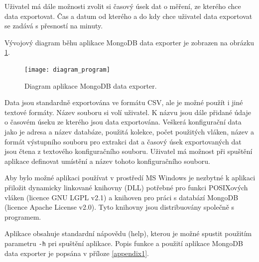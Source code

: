 Uživatel má dále možnosti zvolit si časový úsek dat o měření, ze kterého chce data exportovat. Čas a datum od kterého a do kdy chce uživatel data exportovat se zadává s přesností na minuty. 

Vývojový diagram běhu aplikace MongoDB data exporter je zobrazen na obrázku \ref{diagram_program_pic}.

\begin{figure}[ht]
    \texttt{[image: diagram\_program]}
    \caption{Diagram aplikace MongoDB data exporter.}
    \label{diagram_program_pic}
\end{figure}

Data jsou standardně exportována ve formátu CSV, ale je možné použít i jiné textové formáty. Název souboru si volí uživatel. K názvu jsou dále přidané údaje o časovém úseku ze kterého jsou data exportována.
\newpage
Veškerá konfigurační data jako je adresa a název databáze, použitá kolekce, počet použitých vláken, název a formát výstupního souboru pro extrakci dat a časový úsek exportovaných dat jsou čtena z textového konfiguračního souboru. Uživatel má možnost při spuštění aplikace definovat umístění a název tohoto konfiguračního souboru. 

Aby bylo možné aplikaci používat v prostředí MS Windows je nezbytné k aplikaci přiložit dynamicky linkované knihovny (DLL) potřebné pro funkci POSIXových vláken (licence GNU LGPL v2.1) a knihoven pro práci s databází MongoDB (licence Apache License v2.0). Tyto knihovny jsou distribuovány společně s programem.

Aplikace obsahuje standardní nápovědu (help), kterou je možné spustit použitím parametru \texttt{-h} pri spuštění aplikace. Popis funkce a použití aplikace MongoDB data exporter je popsána v příloze \ref{appendix1}.